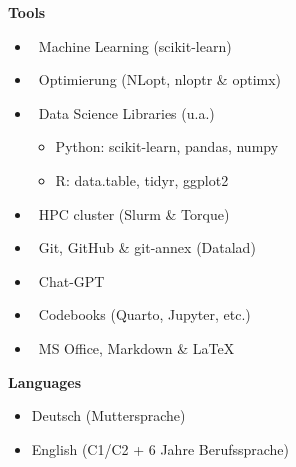 \documentclass[10pt,a4paper,ragged2e,withhyper]{altacv}
\begin{document}
\begin{paracol}{2}
\bfseries\textcolor{emphasis}{Tools}\\
\vspace{0.8em}
\begin{itemize}[label={}, left=0pt, itemsep=5pt, topsep=0pt]
    \item \faLayerGroup{}\ Machine Learning \textnormal{(scikit-learn)}
    \item \faBullseye{}\ Optimierung \textnormal{(NLopt, nloptr \& optimx)}
    \item \faBoxes{}\ Data Science Libraries \textnormal{(u.a.)}
    \begin{itemize}[left=7pt, itemsep=2pt, topsep=2pt]
        \item Python: \textnormal{scikit-learn, pandas, numpy}
        \item R: \textnormal{data.table, tidyr, ggplot2}
    \end{itemize}
    \item \faServer{}\ HPC cluster (\textnormal{Slurm \& Torque)}
    \item \faGit*{}\ Git, GitHub \& git-annex \textnormal{(Datalad)}
    \item \faLaptop{}\ Chat-GPT
    \item \faBook{}\ Codebooks \textnormal{(Quarto, Jupyter, etc.)}
    \item \faPencil*{}\ MS Office, Markdown \& LaTeX
\end{itemize}
\divider{}
\bfseries\textcolor{emphasis}{Languages}
\vspace{1ex}
\begin{itemize}
    \item Deutsch \textnormal{(Muttersprache)}
    \item English \textnormal{(C1/C2 + 6 Jahre Berufssprache)}
\end{itemize}
\vspace{0.5ex}


\end{paracol}
\end{document}
